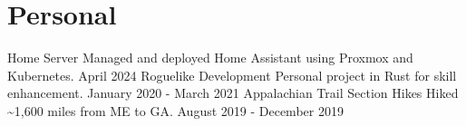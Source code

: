 \documentclass{marvinkassabian_resume}
\begin{document}
\section{Personal}
\subsectionlocationdate
{Home Server}
{Managed and deployed Home Assistant using Proxmox and Kubernetes.}
{April 2024}
\subsectionlocationdate
{Roguelike Development}
{Personal project in Rust for skill enhancement.}
{January 2020 - March 2021}
\subsectionlocationdate
{Appalachian Trail Section Hikes}
{Hiked \~{}1,600 miles from ME to GA.}
{August 2019 - December 2019}
\end{document}
